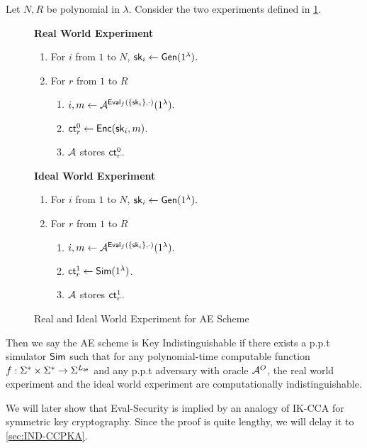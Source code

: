 \begin{definition}
\label{defn:AE-eval-security}
Let $N, R$ be polynomial in $\lambda$. Consider the two experiments defined in \cref{expr:AE-real-ideal-world}.

\begin{figure}[h!]
\begin{framed}
\textbf{Real World Experiment}
\begin{enumerate}
    \item For $i$ from $1$ to $N$, ${\mathsf{sk}}_i \leftarrow \mathsf{Gen}(1^{\lambda}).$
    \item For $r$ from $1$ to $R$
    \begin{enumerate}
        \item $i, m \leftarrow \mathcal{A}^{\mathsf{Eval}_f(\{{\mathsf{sk}}_i\}, \cdot)}(1^{\lambda}).$
        \item $\mathsf{ct}^{0}_r \leftarrow \mathsf{Enc}({\mathsf{sk}}_i, m)$.
        \item $\mathcal{A}$ stores $\mathsf{ct}^{0}_r$.
    \end{enumerate}
\end{enumerate}
\textbf{Ideal World Experiment}
\begin{enumerate}
    \item For $i$ from $1$ to $N$, ${\mathsf{sk}}_i \leftarrow \mathsf{Gen}(1^{\lambda}).$
    \item For $r$ from $1$ to $R$
    \begin{enumerate}
        \item $i, m \leftarrow \mathcal{A}^{\mathsf{Eval}_f(\{{\mathsf{sk}}_i\}, \cdot)}(1^{\lambda}).$
        \item $\mathsf{ct}^{1}_r \leftarrow \mathsf{Sim}(1^{\lambda})$.
        \item $\mathcal{A}$ stores $\mathsf{ct}^{1}_r$.
    \end{enumerate}
\end{enumerate}
\end{framed}
\caption{Real and Ideal World Experiment for AE Scheme}
\label{expr:AE-real-ideal-world}
\end{figure}

Then we say the AE scheme is Key Indistinguishable if there exists a p.p.t simulator $\mathsf{Sim}$ such that for any polynomial-time computable function $f: \Sigma^* \times \Sigma^* \to \Sigma^{L_{\mathsf{ae}}}$ and any p.p.t adversary with oracle $\mathcal{A}^O$, the real world experiment and the ideal world experiment are computationally indistinguishable.
\end{definition}
We will later show that Eval-Security is implied by an analogy of IK-CCA \cite[Definition 1]{BBDP01keyprivate} for symmetric key cryptography. Since the proof is quite lengthy, we will delay it to \cref{sec:IND-CCPKA}.

